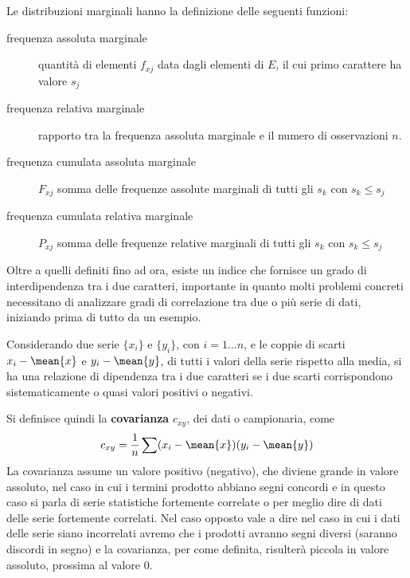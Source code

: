 \documentclass[a4paper,12pt, oneside]{book}
\begin{document}
Le distribuzioni marginali hanno la definizione delle seguenti funzioni:
\begin{description}
    \item [frequenza assoluta marginale] quantità di elementi $f_{xj}$ data dagli elementi di $E$, 
                                         il cui primo carattere ha valore $s_j$
    \item [frequenza relativa marginale] rapporto tra la frequenza assoluta marginale e il numero di osservazioni $n$.
    \item [frequenza cumulata assoluta marginale] $F_{xj}$ somma delle frequenze assolute marginali 
                                                  di tutti gli $s_k$ con $s_k \leq s_j$
    \item [frequenza cumulata relativa marginale] $P_{xj}$ somma delle frequenze relative marginali
                                                  di tutti gli $s_k$ con $s_k \leq s_j$
\end{description}
Oltre a quelli definiti fino ad ora, esiste un indice che fornisce un grado di interdipendenza tra i due caratteri,
importante in quanto molti problemi concreti necessitano di analizzare gradi di correlazione tra due o più serie di dati,
iniziando prima di tutto da un esempio.

Considerando due serie $\{x_i\}$ e $\{y_i\}$, con $i = 1 \dots n$, e le coppie di scarti $x_i - \mean{x}$ 
e $y_i - \mean{y}$, di tutti i valori della serie rispetto alla media, si ha una relazione di dipendenza
tra i due caratteri se i due scarti corrispondono sistematicamente o quasi valori positivi o negativi.

Si definisce quindi la \textbf{covarianza} $c_{xy}$, dei dati o campionaria, come 
\[ c_{xy} = \frac{1}{n} \sum (x_i - \mean{x}) (y_i - \mean{y}) \]
La covarianza assume un valore positivo (negativo), che diviene grande in valore assoluto, nel caso in cui 
i termini prodotto abbiano segni concordi e in questo caso si parla di serie statistiche fortemente correlate
o per meglio dire di dati delle serie fortemente correlati.\newline
Nel caso opposto vale a dire nel caso in cui i dati delle serie siano incorrelati avremo che i prodotti
avranno segni diversi (saranno discordi in segno) e la covarianza, per come definita,
risulterà piccola in valore assoluto, prossima al valore 0.
\end{document}
